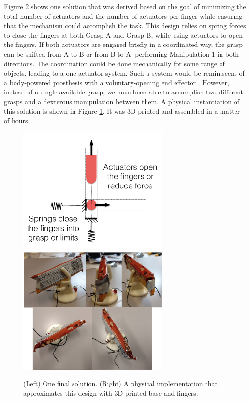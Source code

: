 Figure 2 shows one solution that was derived based on the goal of minimizing the total number of actuators and the number of actuators per finger while ensuring that the mechanism could accomplish the task.  This design relies on spring forces to close the fingers at both Grasp A and Grasp B, while using actuators to open the fingers.   If both actuators are engaged briefly in a coordinated way, the grasp can be shifted from A to B or from B to A, performing Manipulation 1 in both directions.   The coordination could be done mechanically for some range of objects, leading to a one actuator system.   Such a system would be reminiscent of a body-powered prosthesis with a voluntary-opening end effector \cite{smith2004atlas}.   However, instead of a single available grasp, we have been able to accomplish two different grasps and a dexterous manipulation between them.
A physical instantiation of this solution is shown in Figure \ref{SimpleExampleResults}.   It was 3D printed and assembled in a matter of hours.

\begin{figure}
\begin{center}
{\includegraphics[width=3in]{./figs/springCloseDesign.png}}
{\includegraphics[width=3in]{./figs/testManipulator.png}}
\end{center}
\vspace*{-0.2in}
\caption[]{(Left) One final solution.  (Right) A physical implementation that approximates this design with 3D printed base and fingers.}
\label{SimpleExampleResults}
\end{figure}


